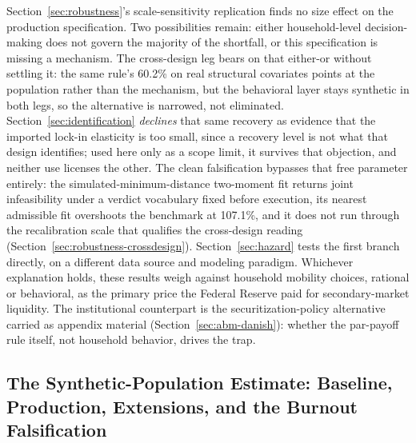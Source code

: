 Section~\ref{sec:robustness}'s scale-sensitivity replication finds no size effect on the production specification. Two possibilities remain: either household-level decision-making does not govern the majority of the shortfall, or this specification is missing a mechanism. The cross-design leg bears on that either-or without settling it: the same rule's 60.2\% on real structural covariates points at the population rather than the mechanism, but the behavioral layer stays synthetic in both legs, so the alternative is narrowed, not eliminated. Section~\ref{sec:identification} \emph{declines} that same recovery as evidence that the imported lock-in elasticity is too small, since a recovery level is not what that design identifies; used here only as a scope limit, it survives that objection, and neither use licenses the other. The clean falsification bypasses that free parameter entirely: the simulated-minimum-distance two-moment fit returns joint infeasibility under a verdict vocabulary fixed before execution, its nearest admissible fit overshoots the benchmark at 107.1\%, and it does not run through the recalibration scale that qualifies the cross-design reading (Section~\ref{sec:robustness-crossdesign}). Section~\ref{sec:hazard} tests the first branch directly, on a different data source and modeling paradigm. Whichever explanation holds, these results weigh against household mobility choices, rational or behavioral, as the primary price the Federal Reserve paid for secondary-market liquidity. The institutional counterpart is the securitization-policy alternative carried as appendix material (Section~\ref{sec:abm-danish}): whether the par-payoff rule itself, not household behavior, drives the trap.

\subsection{The Synthetic-Population Estimate: Baseline, Production, Extensions, and the Burnout Falsification}\label{sec:abm-results}

